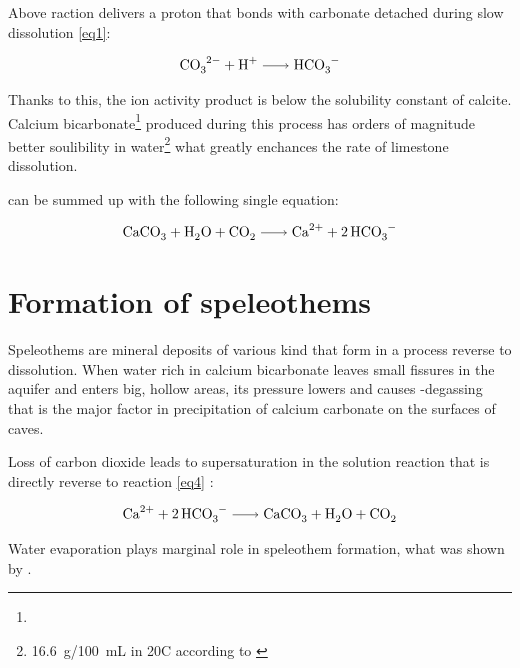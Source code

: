 Above raction delivers a proton that bonds with carbonate detached during slow
dissolution \ref{eq1}:

\begin{equation}
  \ce{CO3^2- + H^+ -> HCO3^-}
  \label{eq3}
\end{equation}

Thanks to this, the ion activity product   is below the
solubility constant of calcite. Calcium bicarbonate\footnote{} produced
during this process has orders of magnitude better soulibility in water\footnote{16.6~g/100~mL in 20\degree C according to \cite{aylward2008si}}
what greatly enchances the rate of limestone dissolution.

 can be summed up with the following single
equation:

\begin{equation}
  \ce{CaCO3 + H2O + CO2 -> Ca^2+ + 2HCO3^- }
  \label{eq4}
\end{equation}

\section{Formation of speleothems}

Speleothems are mineral deposits of various kind that form in a process reverse
to dissolution. When water rich in calcium bicarbonate leaves small fissures in
the aquifer and enters big, hollow areas, its pressure lowers and causes
-degassing that is the major factor in precipitation of calcium carbonate
on the surfaces of caves.

Loss of carbon dioxide leads to supersaturation in the solution reaction that
is directly reverse to reaction \ref{eq4} \parencite{fairchild2012speleothem}:

\begin{equation}
  \ce{Ca^2+ + 2HCO3^- -> CaCO3 + H2O + CO2}
  \label{eq:precipation}
\end{equation}

Water evaporation plays marginal role in speleothem formation, what was shown
by \cite{holland1964cave}.

